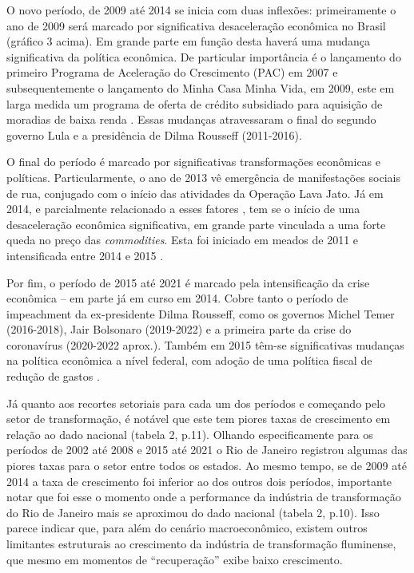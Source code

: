 {{O novo período, de 2009 até 2014 se inicia com duas inflexões:
primeiramente o ano de 2009 será marcado por significativa desaceleração
econômica no Brasil (gráfico 3 acima). Em grande parte em função desta
haverá uma mudança significativa da política econômica. De particular
importância é o lançamento do primeiro Programa de Aceleração do
Crescimento (PAC) em 2007
\citep{rousseff_programa_2007} e
subsequentemente o lançamento do Minha Casa Minha Vida, em 2009, este em
larga medida um programa de oferta de crédito subsidiado para aquisição
de moradias de baixa renda
\citep{brasil_lei_2009}. Essas
mudanças atravessaram o final do segundo governo Lula e a presidência de
Dilma Rousseff (2011-2016).

O final do período é marcado por significativas transformações
econômicas e políticas. Particularmente, o ano de 2013 vê emergência de
manifestações sociais de rua, conjugado com o início das atividades da
Operação Lava Jato. Já em 2014, e parcialmente relacionado a esses
fatores \citep{dieese_implicacoes_2021}, tem se o início de uma desaceleração econômica significativa, em
grande parte vinculada a uma forte queda no preço das
\emph{commodities}. Esta foi iniciado em meados de 2011 e intensificada
entre 2014 e 2015
\citep{fonseca_politica_2020}.

Por fim, o período de 2015 até 2021 é marcado pela intensificação da
crise econômica -- em parte já em curso em 2014. Cobre tanto o período
de impeachment da ex-presidente Dilma Rousseff, como os governos Michel
Temer (2016-2018), Jair Bolsonaro (2019-2022) e a primeira parte da
crise do coronavírus (2020-2022 aprox.). Também em 2015 têm-se
significativas mudanças na política econômica a nível federal, com
adoção de uma política fiscal de redução de gastos
\citep{fonseca_politica_2020}.

Já quanto aos recortes setoriais para cada um dos períodos e começando
pelo setor de transformação, é notável que este tem piores taxas de
crescimento em relação ao dado nacional (tabela 2, p.11). Olhando
especificamente para os períodos de 2002 até 2008 e 2015 até 2021 o Rio
de Janeiro registrou algumas das piores taxas para o setor entre todos
os estados. Ao mesmo tempo, se de 2009 até 2014 a taxa de crescimento
foi inferior ao dos outros dois períodos, importante notar que foi esse
o momento onde a performance da indústria de transformação do Rio de
Janeiro mais se aproximou do dado nacional (tabela 2, p.10). Isso parece
indicar que, para além do cenário macroeconômico, existem outros
limitantes estruturais ao crescimento da indústria de transformação
fluminense, que mesmo em momentos de ``recuperação'' exibe baixo
crescimento.

}}
